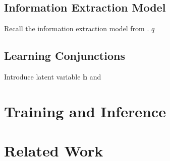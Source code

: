\documentclass{article}
\newcommand{\bh}{\mathbf{h}}
\begin{document}
\subsection{Information Extraction Model}
Recall the information extraction model from \citet{wiseman2017d2t}. $q$

\subsection{Learning Conjunctions}
Introduce latent variable $\bh$ and 


\section{Training and Inference}

\section{Related Work}



\end{document}
